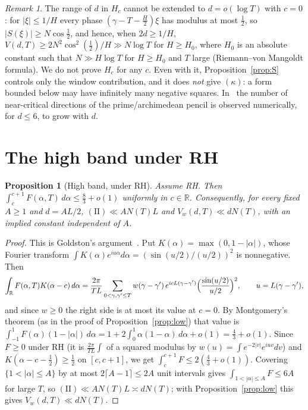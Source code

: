 \documentclass[11pt]{amsart}
\newtheorem{proposition}[theorem]{Proposition}
\theoremstyle{definition}
\theoremstyle{remark}
\newtheorem{remark}[theorem]{Remark}
\newcommand{\bbR}{\mathbb{R}}
\begin{document}
\begin{remark}
The range of $d$ in $H_c$ cannot be extended to $d=o(\log T)$ with $c=0$:
for $|\xi|\le1/H$ every phase $(\gamma-T-\tfrac H2)\xi$ has modulus at most
$\tfrac12$, so $|S(\xi)|\ge N\cos\tfrac12$, and hence, when $2d\ge1/H$,
$V(d,T)\ge 2N^2\cos^2(\tfrac12)/H\gg N\log T$ for $H\ge H_0$, where $H_0$ is an
absolute constant such that $N\gg H\log T$ for $H\ge H_0$ and $T$ large
(Riemann--von Mangoldt formula). We do not
prove $H_c$ for any $c$. Even with it, Proposition~\ref{prop:S}
controls only the window contribution, and it does \emph{not} give $(\kappa)$:
a form bounded below may have infinitely many negative squares. In~\cite{RP16}
the number of near-critical directions of the prime/archimedean pencil is
observed numerically, for $d\le6$, to grow with $d$.
\end{remark}

\section{The high band under RH}
\begin{proposition}[High band, under RH]\label{thm:ae}
Assume RH. Then $\int_c^{c+1}F(\alpha,T)\,d\alpha\le\tfrac83+o(1)$ uniformly in
$c\in\bbR$. Consequently, for every fixed $A\ge1$ and $d=AL/2$,
$\mathrm{(II)}\ll AN(T)L$ and $V_w(d,T)\ll dN(T)$, with an implied constant
independent of $A$.
\end{proposition}
\begin{proof}
This is Goldston's argument~\cite{Gold}. Put $K(\alpha)=\max(0,1-|\alpha|)$,
whose Fourier transform $\int K(\alpha)e^{iu\alpha}d\alpha=(\sin(u/2)/(u/2))^2$
is nonnegative. Then
\[
\int_\bbR F(\alpha,T)K(\alpha-c)\,d\alpha=\frac{2\pi}{TL}\sum_{0<\gamma,\gamma'\le T}
w(\gamma-\gamma')\,e^{icL(\gamma-\gamma')}\Bigl(\frac{\sin(u/2)}{u/2}\Bigr)^2,
\qquad u=L(\gamma-\gamma'),
\]
and since $w\ge0$ the right side is at most its value at $c=0$. By Montgomery's
theorem (as in the proof of Proposition~\ref{prop:low}) that value is
$\int_{-1}^1F(\alpha)(1-|\alpha|)\,d\alpha=1+2\int_0^1\alpha(1-\alpha)\,d\alpha+o(1)
=\tfrac43+o(1)$. Since $F\ge0$ under RH (it is $\frac{2\pi}{TL}\int$ of a squared
modulus by $w(u)=\int e^{-2|v|}e^{iuv}dv$) and $K(\alpha-c-\tfrac12)\ge\tfrac12$ on
$[c,c+1]$, we get $\int_c^{c+1}F\le2(\tfrac43+o(1))$. Covering
$\{1<|\alpha|\le A\}$ by at most $2\lceil A-1\rceil\le2A$ unit intervals gives
$\int_{1<|\alpha|\le A}F\le 6A$ for large $T$, so $\mathrm{(II)}\ll AN(T)L\asymp
dN(T)$; with Proposition~\ref{prop:low} this gives $V_w(d,T)\ll dN(T)$.
\end{proof}
\end{document}
